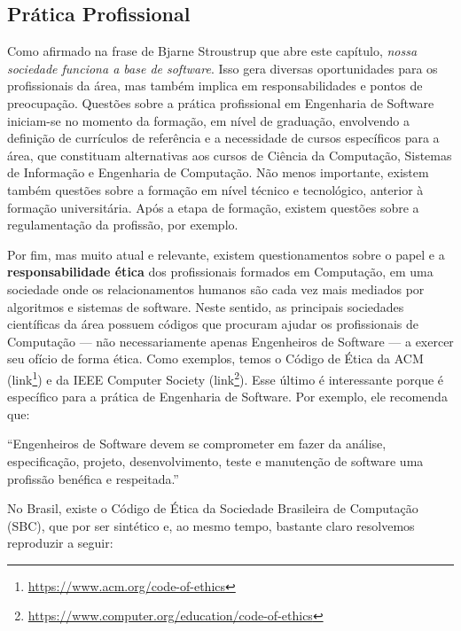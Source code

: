 \documentclass[
  11pt,
  twoside]{book}
\DeclareRobustCommand{\href}[2]{#2\footnote{\url{#1}}}
\renewenvironment{quote}{\centering \vspace{1.5ex} \begin{tcolorbox}[colback=backcolor, width=4.9in]}{\end{tcolorbox}}
\begin{document}
\hypertarget{pruxe1tica-profissional}{%
\subsection{Prática Profissional}\label{pruxe1tica-profissional}}

 Como afirmado na frase de Bjarne Stroustrup
que abre este capítulo, \emph{nossa sociedade funciona a base de
software}. Isso gera diversas oportunidades para os profissionais da
área, mas também implica em responsabilidades e pontos de preocupação.
Questões sobre a prática profissional em Engenharia de Software
iniciam-se no momento da formação, em nível de graduação, envolvendo a
definição de currículos de referência e a necessidade de cursos
específicos para a área, que constituam alternativas aos cursos de
Ciência da Computação, Sistemas de Informação e Engenharia de
Computação. Não menos importante, existem também questões sobre a
formação em nível técnico e tecnológico, anterior à formação
universitária. Após a etapa de formação, existem questões sobre a
regulamentação da profissão, por exemplo.

 Por fim, mas muito atual e relevante, existem
questionamentos sobre o papel e a \textbf{responsabilidade ética} dos
profissionais formados em Computação, em uma sociedade onde os
relacionamentos humanos são cada vez mais mediados por algoritmos e
sistemas de software. Neste sentido, as principais sociedades
científicas da área possuem códigos que procuram ajudar os profissionais
de Computação --- não necessariamente apenas Engenheiros de Software ---
a exercer seu ofício de forma ética. Como exemplos, temos o Código de
Ética da ACM (\href{https://www.acm.org/code-of-ethics}{link}) e da IEEE
Computer Society
(\href{https://www.computer.org/education/code-of-ethics}{link}). Esse
último é interessante porque é específico para a prática de Engenharia
de Software. Por exemplo, ele recomenda que:

\begin{quote}
``Engenheiros de Software devem se comprometer em fazer da análise,
especificação, projeto, desenvolvimento, teste e manutenção de software
uma profissão benéfica e respeitada.''
\end{quote}

 No Brasil, existe o Código de Ética da Sociedade
Brasileira de Computação (SBC), que por ser sintético e, ao mesmo tempo,
bastante claro resolvemos reproduzir a seguir:
\end{document}
